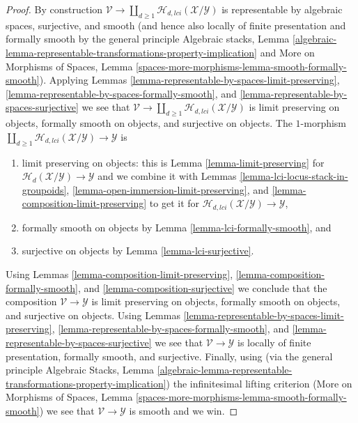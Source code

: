\begin{proof}
\medskip\noindent
By construction $\mathcal{V} \to
\coprod\nolimits_{d \geq 1} \mathcal{H}_{d, lci}(\mathcal{X}/\mathcal{Y})$
is representable by algebraic spaces, surjective, and smooth (and hence
also locally of finite presentation and formally smooth by the general
principle
Algebraic stacks, Lemma
\ref{algebraic-lemma-representable-transformations-property-implication}
and
More on Morphisms of Spaces,
Lemma \ref{spaces-more-morphisms-lemma-smooth-formally-smooth}).
Applying
Lemmas \ref{lemma-representable-by-spaces-limit-preserving},
\ref{lemma-representable-by-spaces-formally-smooth}, and
\ref{lemma-representable-by-spaces-surjective}
we see that $\mathcal{V} \to
\coprod\nolimits_{d \geq 1} \mathcal{H}_{d, lci}(\mathcal{X}/\mathcal{Y})$
is limit preserving on objects, formally smooth on objects, and
surjective on objects. The $1$-morphism
$\coprod\nolimits_{d \geq 1} \mathcal{H}_{d, lci}(\mathcal{X}/\mathcal{Y})
\to \mathcal{Y}$ is
\begin{enumerate}
\item limit preserving on objects: this is
Lemma \ref{lemma-limit-preserving}
for $\mathcal{H}_d(\mathcal{X}/\mathcal{Y}) \to \mathcal{Y}$
and we combine it with Lemmas
\ref{lemma-lci-locus-stack-in-groupoids},
\ref{lemma-open-immersion-limit-preserving}, and
\ref{lemma-composition-limit-preserving}
to get it for $\mathcal{H}_{d, lci}(\mathcal{X}/\mathcal{Y}) \to \mathcal{Y}$,
\item formally smooth on objects by
Lemma \ref{lemma-lci-formally-smooth},
and
\item surjective on objects by
Lemma \ref{lemma-lci-surjective}.
\end{enumerate}
Using
Lemmas \ref{lemma-composition-limit-preserving},
\ref{lemma-composition-formally-smooth}, and
\ref{lemma-composition-surjective}
we conclude that the composition $\mathcal{V} \to \mathcal{Y}$ is
limit preserving on objects, formally smooth on objects, and
surjective on objects.
Using
Lemmas \ref{lemma-representable-by-spaces-limit-preserving},
\ref{lemma-representable-by-spaces-formally-smooth}, and
\ref{lemma-representable-by-spaces-surjective}
we see that $\mathcal{V} \to \mathcal{Y}$ is
locally of finite presentation, formally smooth, and surjective.
Finally, using (via the general principle
Algebraic Stacks,
Lemma \ref{algebraic-lemma-representable-transformations-property-implication})
the infinitesimal lifting criterion
(More on Morphisms of Spaces, Lemma
\ref{spaces-more-morphisms-lemma-smooth-formally-smooth})
we see that $\mathcal{V} \to \mathcal{Y}$ is smooth and we win.
\end{proof}








